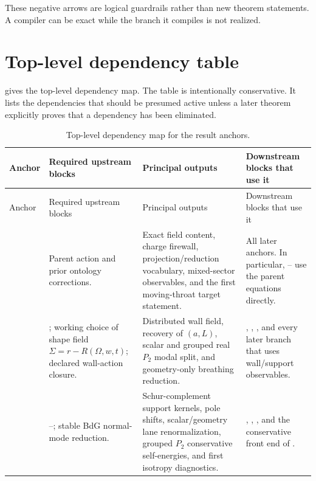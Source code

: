 These negative arrows are logical guardrails rather than new theorem statements.  A compiler can be exact while the branch it compiles is not realized.

\section{Top-level dependency table}
\label{sec:top-level-dependency-table}

 gives the top-level dependency map.  The table is intentionally conservative.  It lists the dependencies that should be presumed active unless a later theorem explicitly proves that a dependency has been eliminated.

\begin{longtable}{L{0.11\textwidth}L{0.22\textwidth}L{0.25\textwidth}L{0.28\textwidth}}
\caption{Top-level dependency map for the result anchors.}\label{tab:top-level-dependencies}\\
\toprule
Anchor & Required upstream blocks & Principal outputs & Downstream blocks that use it \\
\midrule
\endfirsthead
\toprule
Anchor & Required upstream blocks & Principal outputs & Downstream blocks that use it \\
\midrule
\endhead
{} & Parent action and prior ontology corrections. & Exact field content, charge firewall, projection/reduction vocabulary, mixed-sector observables, and the first moving-throat target statement. & All later anchors.  In particular, -- use the parent equations directly. \\
\addlinespace
{} & ; working choice of shape field \(\Sigma=r-R(\Omega,w,t)\); declared wall-action closure. & Distributed wall field, recovery of \((a,L)\), scalar and grouped real \(P_2\) modal split, and geometry-only breathing reduction. & , , , and every later branch that uses wall/support observables. \\
\addlinespace
{} & --; stable BdG normal-mode reduction. & Schur-complement support kernels, pole shifts, scalar/geometry lane renormalization, grouped \(P_2\) conservative self-energies, and first isotropy diagnostics. & , , , and the conservative front end of . \\

\end{longtable}
